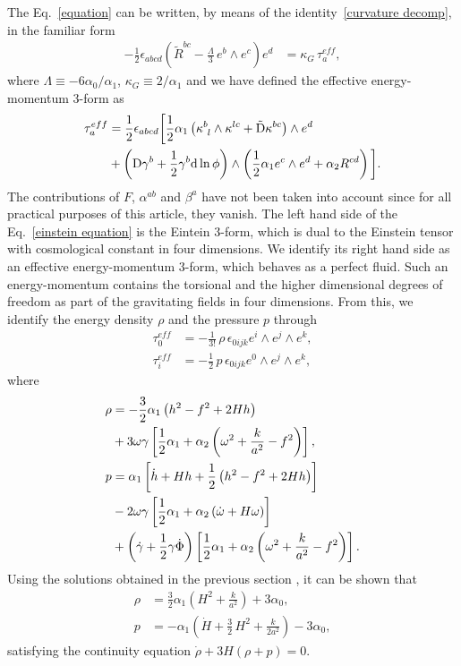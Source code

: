 \documentclass[aps,prd,12pt,superscriptaddress,showpacs,showkeys,longbibliography,reprint,nofootinbib]{revtex4-1}
\begin{document}
The Eq.~\eqref{equation} can be written, by means of the identity~\eqref{curvature decomp}, in the familiar form
\begin{align}\label{einstein equation}
-\frac{1}{2}\epsilon_{abcd}\left(\tilde{R}^{bc} - \frac{\Lambda}{3}\,e^b\wedge e^c\right)e^d &= \kappa_{G}\,\tau^{eff}_a,
\end{align}
where $\Lambda \equiv -6\alpha_0/\alpha_1$, $\kappa_{G} \equiv 2/\alpha_1$ and we have defined the effective energy-momentum $3$-form as
\begin{align}
\tau_a^{eff}&= \frac{1}{2}\epsilon_{abcd}\bigg[\frac{1}{2}\alpha_1\left(\kappa^b_{\ l}\wedge\kappa^{lc}+\tilde{\text{D}}\kappa^{bc}\right)\wedge e^d\notag\\
&+\left(\text{D}\gamma^b+\frac{1}{2}\gamma^b\text{d}\ln\phi\right)\wedge\left(\frac{1}{2}\alpha_1e^c\wedge e^d+\alpha_2R^{cd}\right)\bigg].
\end{align}
The contributions of $F$, $\alpha^{ab}$ and $\beta^a$ have not been taken into account since for all practical purposes of this article, they vanish. The left hand side of the Eq.~\eqref{einstein equation} is the Eintein $3$-form, which is dual to the Einstein tensor with cosmological constant in four dimensions. We identify its right hand side as an effective energy-momentum $3$-form, which behaves as a perfect fluid. Such an energy-momentum contains the torsional and the higher dimensional degrees of freedom as part of the gravitating fields in four dimensions. From this, we identify the energy density $\rho$ and the pressure $p$ through
\begin{align}
\tau_0^{eff}&=-\frac{1}{3!}\,\rho\,\epsilon_{0ijk}e^i\wedge e^j\wedge e^k,\\
\tau_i^{eff}&=-\frac{1}{2}\,p\,\epsilon_{0ijk}e^0\wedge e^j\wedge e^k,
\end{align} 
where
\begin{align}\label{rho}
\rho&=-\frac{3}{2}\alpha_1\left(h^2-f^2+2Hh\right)\notag\\
&+3\omega\gamma\left[\frac{1}{2}\alpha_1+\alpha_2\left(\omega^2+\frac{k}{a^2}-f^2\right)\right],\\
\label{presion}
p&=\alpha_1\left[\dot{h}+Hh+\frac{1}{2}\left(h^2-f^2+2Hh\right)\right]\notag\\
&-2\omega\gamma\left[\frac{1}{2}\alpha_1+\alpha_2\left(\dot{\omega}+H\omega\right)\right]\notag\\
&+\left(\dot{\gamma}+\frac{1}{2}\gamma\dot{\Phi}\right)\left[\frac{1}{2}\alpha_1+\alpha_2\left(\omega^2+\frac{k}{a^2}-f^2\right)\right].
\end{align}
Using the solutions obtained in the previous section , it can be shown that
\begin{align}
\rho &= \frac{3}{2}\alpha_1\left(H^2 + \frac{k}{a^2}\right) + 3\alpha_0, \\
p &= -\alpha_1\left(\dot{H} + \frac{3}{2}\,H^2 + \frac{k}{2a^2}\right) - 3\alpha_0,
\end{align}
satisfying the continuity equation $\dot{\rho}+3H\left(\rho+p\right)=0$. 
\end{document}
